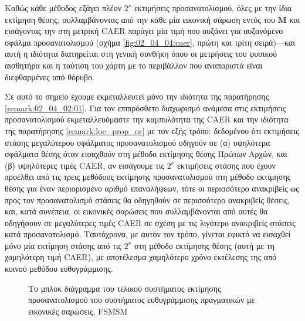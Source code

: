 Καθώς κάθε μέθοδος εξάγει πλέον $2^\nu$ εκτιμήσεις προσανατολισμού, όλες με την
ίδια εκτίμηση θέσης, συλλαμβάνοντας από την κάθε μία εικονική σάρωση εντός του
$\bm{M}$ και εισάγοντας την στη μετρική CAER παράγει μία τιμή που αυξάνει για
αυξανόμενο σφάλμα προσανατολισμού (σχήμα \ref{fig:02_04_04:caer}, πρώτη και
τρίτη σειρά)---και αυτή η ιδιότητα διατηρείται στη γενική συνθήκη όπου οι
μετρήσεις του φυσικού αισθητήρα και η ταύτιση του χάρτη με το περιβάλλον που
αναπαριστά είναι διεφθαρμένες από θόρυβο.

Σε αυτό το σημείο έχουμε εκμεταλλευτεί μόνο την ιδιότητα της παρατήρησης
\ref{remark:02_04_02:01}. Για τον επιπρόσθετο διαχωρισμό ανάμεσα στις
εκτιμήσεις προσανατολισμού εκμεταλλευόμαστε την καμπυλότητα της CAER και την
ιδιότητα της παρατήρησης \ref{remark:loc_prop_or} με τον εξής τρόπο: δεδομένου
ότι εκτιμήσεις στάσης μεγαλύτερου σφάλματος  προσανατολισμού οδηγούν σε (α)
υψηλότερα σφάλματα θέσης όταν εισαχθούν στη μέθοδο εκτίμησης θέσης Πρώτων
Αρχών, και (β) υψηλότερες τιμές CAER, αν εισάγουμε τις $2^\nu$ εκτιμήσεις
στάσης που έχουν προέλθει από τις τρεις μεθόδους εκτίμησης προσανατολισμού στη
μέθοδο εκτίμησης θέσης για έναν περιορισμένο αριθμό επαναλήψεων, τότε οι
περισσότερο ανακριβείς ως προς τον προσανατολισμό στάσεις θα οδηγηθούν σε
περισσότερο ανακριβείς θέσεις, και, κατά συνέπεια, οι εικονικές σαρώσεις που
συλλαμβάνονται από αυτές θα οδηγήσουν σε μεγαλύτερες τιμές CAER σε σχέση με τις
λιγότερο ανακριβείς στάσεις κατά προσανατολισμό. Ταυτόχρονα, με αυτόν τον
τρόπο, γίνεται εφικτό να εισαχθεί μόνο μία εκτίμηση στάσης από τις $2^\nu$ στη
μέθοδο εκτίμησης θέσης (αυτή με τη χαμηλότερη τιμή CAER), με αποτέλεσμα
χαμηλότερο χρόνο εκτέλεσης της από κοινού μεθόδου ευθυγράμμισης.


\begin{figure}[!h]\centering
  
  \caption{\small Το μπλοκ διάγραμμα του τελικού συστήματος εκτίμησης
           προσανατολισμού του συστήματος ευθυγράμμισης πραγματικών με εικονικές
           σαρώσεις, FSMSM}
  \label{fig:02_04_04:inner_rotation_system}
\end{figure}


